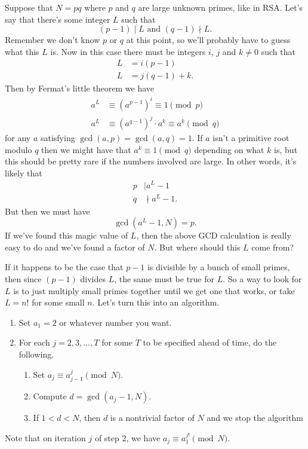\documentclass[12pt]{article}
\theoremstyle{plain}
\theoremstyle{definition}
\theoremstyle{remark}
\begin{document}
Suppose that $N = pq$ where $p$ and $q$ are large unknown primes, like in RSA.
Let's say that there's some integer $L$ such that
\[
    (p-1)\mid L\text{ and } (q-1)\nmid L.
\]
Remember we don't know $p$ or $q$ at this point, so we'll probably have to guess what this $L$ is.
Now in this case there must be integers $i$, $j$ and $k\neq 0$ such that
\begin{align*}
    L &= i(p-1)\\
    L &= j(q-1)+k.
\end{align*}
Then by Fermat's little theorem we have
\begin{align*}
    a^L &\equiv (a^{p-1})^i \equiv 1\pmod p\\
    a^L &\equiv (a^{q-1})^j\cdot a^k \equiv a^k\pmod q
\end{align*}
for any $a$ satisfying $\gcd(a,p) = \gcd(a,q) = 1$.
If $a$ isn't a primitive root modulo $q$ then we might have that $a^k\equiv 1\pmod q$ depending on what $k$ is, but this should be pretty rare if the numbers involved are large.
In other words, it's likely that
\begin{align*}
    p &\mid a^L-1\\
    q &\nmid a^L-1.
\end{align*}
But then we must have
\[
    \gcd(a^L-1, N) = p.
\]
If we've found this magic value of $L$, then the above GCD calculation is really easy to do and we've found a factor of $N$.
But where should this $L$ come from?

If it happens to be the case that $p-1$ is divisible by a bunch of small primes, then since $(p-1)$ divides $L$, the same must be true for $L$.
So a way to look for $L$ is to just multiply small primes together until we get one that works, or take $L = n!$ for some small $n$.
Let's turn this into an algorithm.

\begin{enumerate}
    \item Set $a_1 =2$ or whatever number you want.
    \item For each $j = 2, 3, \ldots, T$ for some $T$ to be specified ahead of time, do the following.
    \begin{enumerate}
        \item Set $a_j \equiv a_{j-1}^j\pmod N$.
        \item Compute $d = \gcd(a_j  - 1, N)$.
        \item If $1 < d < N$, then $d$ is a nontrivial factor of $N$ and we stop the algorithm
    \end{enumerate}
\end{enumerate}
Note that on iteration $j$ of step 2, we have $a_j \equiv a_1^{j!}\pmod N$.
\end{document}
